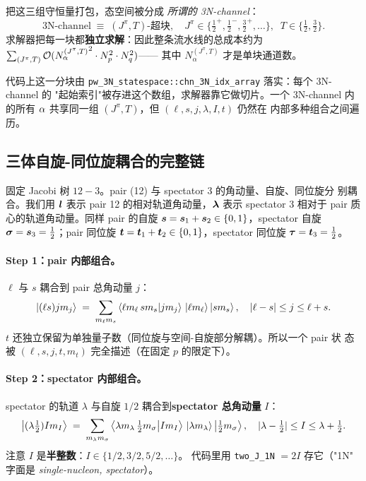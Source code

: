 把这三组守恒量打包，态空间被分成 \emph{所谓的 3N-channel}：
\begin{equation}
\label{eq:ch07-3N-channel-def}
\boxed{\;
\text{3N-channel} \;\equiv\; (J^\pi, T)\text{-超块},
\quad
J^\pi \in \{\tfrac{1}{2}^{+}, \tfrac{1}{2}^{-}, \tfrac{3}{2}^{+}, \ldots\},
\;\;
T \in \{\tfrac{1}{2}, \tfrac{3}{2}\}.
\;}
\end{equation}
求解器把每一块都\textbf{独立求解}：因此整条流水线的总成本约为
\(\sum_{(J^\pi,T)} \mathcal{O}({N_\alpha^{(J^\pi,T)}}^2 \cdot N_p^2 \cdot N_q^2)\)——
其中 \(N_\alpha^{(J^\pi,T)}\) 才是单块通道数。

代码上这一分块由
\texttt{pw\_3N\_statespace::chn\_3N\_idx\_array} 落实：每个 3N-channel 的
"起始索引"被存进这个数组，求解器靠它做切片。一个 3N-channel 内的所有
\(\alpha\) 共享同一组 \((J^\pi, T)\)，但 \((\ell, s, j, \lambda, I, t)\) 仍然在
内部多种组合之间遍历。

\subsection{三体自旋-同位旋耦合的完整链}
\label{subsec:ch07-spin-isospin-chain}

固定 Jacobi 树 \(12\!-\!3\)。pair (12) 与 spectator 3 的角动量、自旋、同位旋分
别耦合。我们用 \(\bm{l}\) 表示 pair 12 的相对轨道角动量，\(\bm{\lambda}\)
表示 spectator 3 相对于 pair 质心的轨道角动量。同样 pair 的自旋
\(\bm{s} = \bm{s}_1 + \bm{s}_2 \in \{0, 1\}\)，spectator 自旋 \(\bm{\sigma} =
\bm{s}_3 = \tfrac{1}{2}\)；pair 同位旋 \(\bm{t} = \bm{t}_1 + \bm{t}_2 \in
\{0, 1\}\)，spectator 同位旋 \(\bm{\tau} = \bm{t}_3 = \tfrac{1}{2}\)。

\paragraph{Step 1：pair 内部组合。}
\(\ell\) 与 \(s\) 耦合到 pair 总角动量 \(j\)：
\begin{equation}
\label{eq:ch07-couple-j}
\ket{(\ell s) j m_j} \;=\; \sum_{m_\ell m_s}
\braket{\ell m_\ell\, s m_s}{j m_j}\, \ket{\ell m_\ell}\ket{s m_s},
\quad |\ell - s| \le j \le \ell + s.
\end{equation}
\(t\) 还独立保留为单独量子数（同位旋与空间-自旋部分解耦）。所以一个 pair 状
态被 \((\ell, s, j, t, m_t)\) 完全描述（在固定 \(p\) 的限定下）。

\paragraph{Step 2：spectator 内部组合。}
spectator 的轨道 \(\lambda\) 与自旋 \(1/2\) 耦合到\textbf{spectator 总角动量}
\(I\)：
\begin{equation}
\label{eq:ch07-couple-I}
\ket{(\lambda \tfrac{1}{2}) I m_I} \;=\; \sum_{m_\lambda m_\sigma}
\braket{\lambda m_\lambda\, \tfrac{1}{2} m_\sigma}{I m_I}\,
\ket{\lambda m_\lambda}\ket{\tfrac{1}{2} m_\sigma},
\quad |\lambda - \tfrac{1}{2}| \le I \le \lambda + \tfrac{1}{2}.
\end{equation}
注意 \(I\) 是\textbf{半整数}：\(I \in \{1/2, 3/2, 5/2, \ldots\}\)。
代码里用 \verb|two_J_1N| \(= 2I\) 存它（"1N" 字面是
\emph{single-nucleon, spectator}）。

